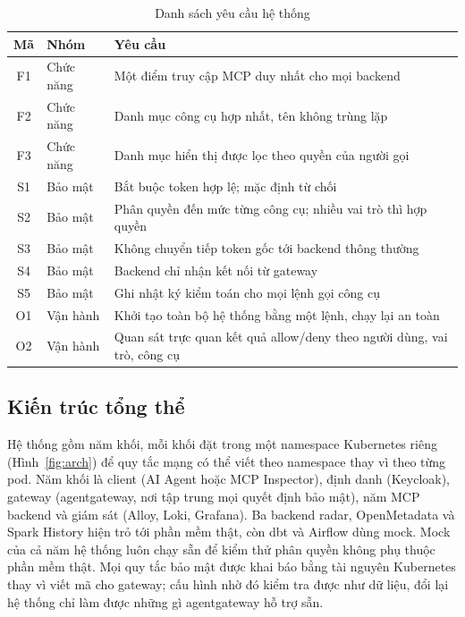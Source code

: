 \begin{table}[!htb]\centering\caption{Danh sách yêu cầu hệ thống}\label{tab:yeucau}
{\singlespacing\renewcommand{\arraystretch}{1.2}
\begin{tabularx}{\textwidth}{|c|p{2.6cm}|X|}\hline
\textbf{Mã} & \textbf{Nhóm} & \textbf{Yêu cầu} \\ \hline
F1 & Chức năng & Một điểm truy cập MCP duy nhất cho mọi backend \\ \hline
F2 & Chức năng & Danh mục công cụ hợp nhất, tên không trùng lặp \\ \hline
F3 & Chức năng & Danh mục hiển thị được lọc theo quyền của người gọi \\ \hline
S1 & Bảo mật & Bắt buộc token hợp lệ; mặc định từ chối \\ \hline
S2 & Bảo mật & Phân quyền đến mức từng công cụ; nhiều vai trò thì hợp quyền \\ \hline
S3 & Bảo mật & Không chuyển tiếp token gốc tới backend thông thường \\ \hline
S4 & Bảo mật & Backend chỉ nhận kết nối từ gateway \\ \hline
S5 & Bảo mật & Ghi nhật ký kiểm toán cho mọi lệnh gọi công cụ \\ \hline
O1 & Vận hành & Khởi tạo toàn bộ hệ thống bằng một lệnh, chạy lại an toàn \\ \hline
O2 & Vận hành & Quan sát trực quan kết quả allow/deny theo người dùng, vai trò, công cụ \\ \hline
\end{tabularx}}\end{table}

\subsection{Kiến trúc tổng thể}

Hệ thống gồm năm khối, mỗi khối đặt trong một namespace Kubernetes riêng (Hình~\ref{fig:arch}) để quy tắc mạng có thể viết theo namespace thay vì theo từng pod. Năm khối là client (AI Agent hoặc MCP Inspector), định danh (Keycloak), gateway (agentgateway, nơi tập trung mọi quyết định bảo mật), năm MCP backend và giám sát (Alloy, Loki, Grafana). Ba backend radar, OpenMetadata và Spark History hiện trỏ tới phần mềm thật, còn dbt và Airflow dùng mock. Mock của cả năm hệ thống luôn chạy sẵn để kiểm thử phân quyền không phụ thuộc phần mềm thật. Mọi quy tắc bảo mật được khai báo bằng tài nguyên Kubernetes thay vì viết mã cho gateway; cấu hình nhờ đó kiểm tra được như dữ liệu, đổi lại hệ thống chỉ làm được những gì agentgateway hỗ trợ sẵn.

